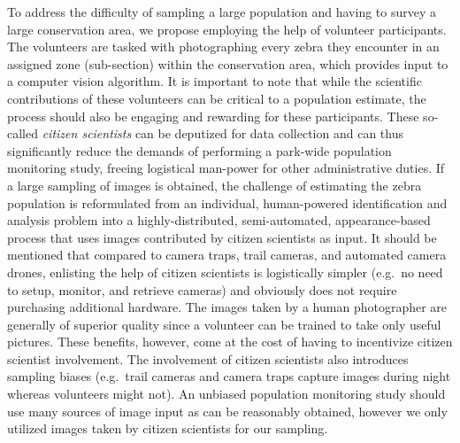 To address the difficulty of sampling a large population and having to survey a large conservation area, we propose employing the help of volunteer participants.  The volunteers are tasked with photographing every zebra they encounter in an assigned zone (sub-section) within the conservation area, which provides input to a computer vision algorithm.  It is important to note that while the scientific contributions of these volunteers can be critical to a population estimate, the process should also be engaging and rewarding for these participants.  These so-called \textit{citizen scientists} \cite{cohn_citizen_2008, haklay_geographical_2010, sui_citizen_2013, irwin_citizen_1995, silvertown_new_2009} can be deputized for data collection and can thus significantly reduce the demands of performing a park-wide population monitoring study, freeing logistical man-power for other administrative duties.  If a large sampling of images is obtained, the challenge of estimating the zebra population is reformulated from an individual, human-powered identification and analysis problem into a highly-distributed, semi-automated, appearance-based process that uses images contributed by citizen scientists as input.  It should be mentioned that compared to camera traps, trail cameras, and automated camera drones, enlisting the help of citizen scientists is logistically simpler (e.g.\ no need to setup, monitor, and retrieve cameras) and obviously does not require purchasing additional hardware.  The images taken by a human photographer are generally of superior quality since a volunteer can be trained to take only useful pictures.  These benefits, however, come at the cost of having to incentivize citizen scientist involvement.   The involvement of citizen scientists also introduces sampling biases (e.g.\ trail cameras and camera traps capture images during night whereas volunteers might not).  An unbiased population monitoring study should use many sources of image input as can be reasonably obtained, however we only utilized images taken by citizen scientists for our sampling.

